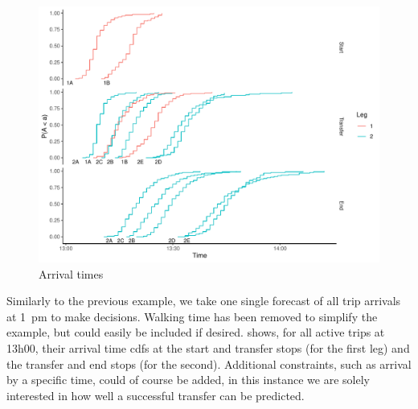 \begin{knitrout}\small
{}\color{fgcolor}\begin{figure}

{\centering \includegraphics[width=\textwidth]{figure/eta_journey_transfer_graph-1} 

}

\caption[Arrival times]{Arrival times}\label{fig:eta_journey_transfer_graph}
\end{figure}


\end{knitrout}


Similarly to the previous example, we take one single forecast of all trip arrivals at 1~pm to make decisions. Walking time has been removed to simplify the example, but could easily be included if desired.  shows, for all active trips at 13h00, their arrival time \glspl{cdf} at the start and transfer stops (for the first leg) and the transfer and end stops (for the second). Additional constraints, such as arrival by a specific time, could of course be added, in this instance we are solely interested in how well a successful transfer can be predicted.


